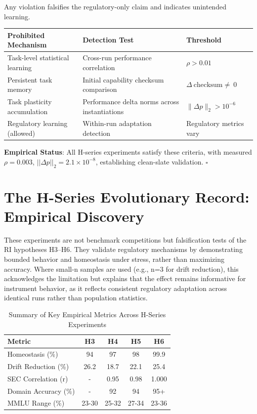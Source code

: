 \documentclass[12pt,a4paper]{report}
\newcommand{\neqU}{\neq}
\newcommand{\rhoU}{\rho}
\newcommand{\DeltaU}{\Delta}
\newcommand{\subtwo}{_2}
\newcommand{\squareU}{\square}
\begin{document}
Any violation falsifies the regulatory-only claim and indicates unintended learning.

\renewcommand{\arraystretch}{2} %

\begin{table}[ht]
\centering
\begin{tabular}{p{6cm} p{4cm} p{3cm}}
\toprule
\textbf{Prohibited Mechanism} & \textbf{Detection Test} & \textbf{Threshold} \\
\midrule
Task-level statistical learning & Cross-run performance correlation & $\rhoU > 0.01$ \\
Persistent task memory & Initial capability checksum comparison & $\DeltaU\ \text{checksum} \neqU\ 0$ \\
Task plasticity accumulation & Performance delta norms across instantiations & $\lVert \DeltaU p \rVert\subtwo > 10^{-6}$ \\
Regulatory learning (allowed) & Within-run adaptation detection & Regulatory metrics vary \\
\bottomrule
\end{tabular}
\end{table}

\textbf{Empirical Status}: All H-series experiments satisfy these criteria, with measured $\rhoU = 0.003$, $||\DeltaU p||\subtwo = 2.1 \times 10^{-8}$, establishing clean-slate validation. $\squareU$

\chapter{The H-Series Evolutionary Record: Empirical Discovery}

These experiments are not benchmark competitions but falsification tests of the RI hypotheses H3–H6. They validate regulatory mechanisms by demonstrating bounded behavior and homeostasis under stress, rather than maximizing accuracy. Where small-n samples are used (e.g., n=3 for drift reduction), this acknowledges the limitation but explains that the effect remains informative for instrument behavior, as it reflects consistent regulatory adaptation across identical runs rather than population statistics.

\begin{table}[ht]
\centering
\caption{Summary of Key Empirical Metrics Across H-Series Experiments}
\label{tab:h-series-summary}
\begin{tabular}{@{}lcccc@{}}
\toprule
Metric & H3 & H4 & H5 & H6 \\
\midrule
Homeostasis (\%) & 94 & 97 & 98 & 99.9 \\
Drift Reduction (\%) & 26.2 & 18.7 & 22.1 & 25.4 \\
SEC Correlation (r) & - & 0.95 & 0.98 & 1.000 \\
Domain Accuracy (\%) & - & 92 & 94 & 95+ \\
MMLU Range (\%) & 23-30 & 25-32 & 27-34 & 23-36 \\
\bottomrule
\end{tabular}
\end{table}
\end{document}
